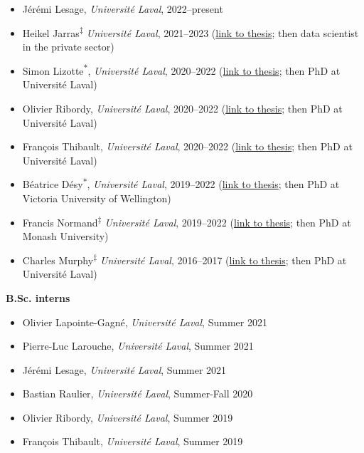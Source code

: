 \documentclass[11pt]{article}
\begin{document}
\begin{itemize}
  \item Jérémi Lesage, \textit{Universit\'e Laval}, 2022--present
  \item Heikel Jarras\textsuperscript{$\ddagger$} \textit{Universit\'e Laval}, 2021--2023 {\small (\href{http://hdl.handle.net/20.500.11794/125407}{link to thesis}; then data scientist in the private sector)}
  \item Simon Lizotte\textsuperscript{$\ast$}, \textit{Universit\'e Laval}, 2020--2022 {\small(\href{http://antoineallard.github.io/files/theses/Lizotte.2022.MSc.pdf}{link to thesis}; then PhD at Université Laval)}
  \item Olivier Ribordy, \textit{Universit\'e Laval}, 2020--2022 {\small(\href{http://antoineallard.github.io/files/theses/Ribordy.2022.MSc.pdf}{link to thesis}; then PhD at Université Laval)}
  \item Fran\c{c}ois Thibault, \textit{Universit\'e Laval}, 2020--2022 {\small(\href{http://antoineallard.github.io/files/theses/Thibault.2022.MSc.pdf}{link to thesis}; then PhD at Université Laval)}
  \item B\'eatrice D\'esy\textsuperscript{$\ast$}, \textit{Universit\'e Laval}, 2019--2022 {\small(\href{http://antoineallard.github.io/files/theses/Desy.2022.MSc.pdf}{link to thesis}; then PhD at Victoria University of Wellington)}
  \item Francis Normand\textsuperscript{$\ddagger$} \textit{Universit\'e Laval}, 2019--2022 {\small(\href{http://hdl.handle.net/20.500.11794/73573}{link to thesis}; then PhD at Monash University)}
  \item Charles Murphy\textsuperscript{$\ddagger$} \textit{Universit\'e Laval}, 2016--2017 {\small(\href{http://hdl.handle.net/20.500.11794/30382}{link to thesis}; then PhD at Université Laval)}
\end{itemize}
%
%
%
\textbf{B.Sc. interns}
%
\begin{itemize}
  \item Olivier Lapointe-Gagn\'e, \textit{Universit\'e Laval}, Summer 2021
  \item Pierre-Luc Larouche, \textit{Universit\'e Laval}, Summer 2021
  \item Jérémi Lesage, \textit{Universit\'e Laval}, Summer 2021
  \item Bastian Raulier, \textit{Universit\'e Laval}, Summer-Fall 2020
  \item Olivier Ribordy, \textit{Universit\'e Laval}, Summer 2019
  \item Fran\c{c}ois Thibault, \textit{Universit\'e Laval}, Summer 2019
\end{itemize}
\end{document}
